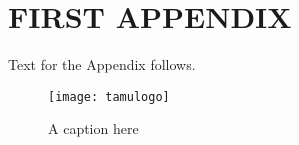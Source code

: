 %
%	 
%



\chapter{FIRST APPENDIX}

Text for the Appendix follows.

\begin{figure}[ht]
    \centering
    \texttt{[image: tamulogo]}
    \caption{A caption here}
\end{figure}


